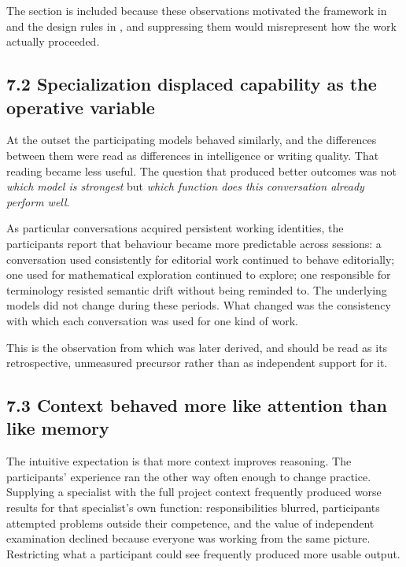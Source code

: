 The section is included because these observations motivated the framework in  and the design rules in , and suppressing them would misrepresent how the work actually proceeded.


\subsection*{7.2 Specialization displaced capability as the operative variable}
\label{sec:en:7.2}

At the outset the participating models behaved similarly, and the differences between them were read as differences in intelligence or writing quality. That reading became less useful. The question that produced better outcomes was not \emph{which model is strongest} but \emph{which function does this conversation already perform well}.

As particular conversations acquired persistent working identities, the participants report that behaviour became more predictable across sessions: a conversation used consistently for editorial work continued to behave editorially; one used for mathematical exploration continued to explore; one responsible for terminology resisted semantic drift without being reminded to. The underlying models did not change during these periods. What changed was the consistency with which each conversation was used for one kind of work.

This is the observation from which  was later derived, and should be read as its retrospective, unmeasured precursor rather than as independent support for it.


\subsection*{7.3 Context behaved more like attention than like memory}
\label{sec:en:7.3}

The intuitive expectation is that more context improves reasoning. The participants' experience ran the other way often enough to change practice. Supplying a specialist with the full project context frequently produced worse results for that specialist's own function: responsibilities blurred, participants attempted problems outside their competence, and the value of independent examination declined because everyone was working from the same picture. Restricting what a participant could see frequently produced more usable output.

